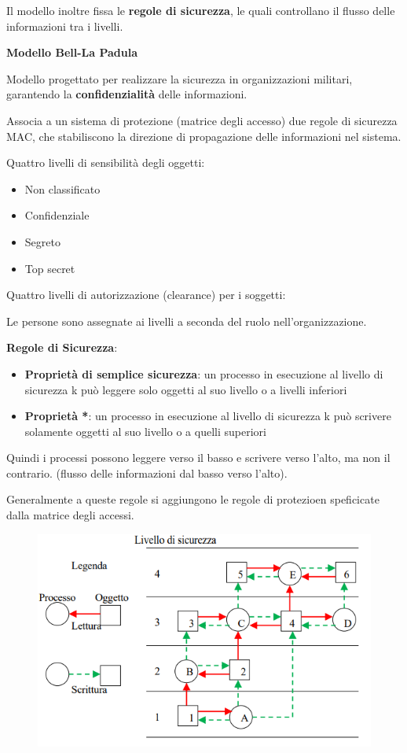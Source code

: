 \documentclass{article}
\begin{document}
\vspace{3mm}
Il modello inoltre fissa le \textbf{regole di sicurezza}, le quali controllano il flusso delle informazioni tra i livelli.

\vspace{3mm}
\textbf{Modello Bell-La Padula}
\vspace{3mm}

Modello progettato per realizzare la sicurezza in organizzazioni militari, garantendo la \textbf{confidenzialità} delle informazioni.

Associa a un sistema di protezione (matrice degli accesso) due regole di sicurezza MAC, che stabiliscono la direzione di propagazione delle informazioni nel sistema.

\vspace{3mm}
Quattro livelli di sensibilità degli oggetti:
\begin{itemize}
    \item Non classificato
    \item Confidenziale
    \item Segreto
    \item Top secret
\end{itemize}

\vspace{3mm}
Quattro livelli di autorizzazione (clearance) per i soggetti:

Le persone sono assegnate ai livelli a seconda del ruolo nell'organizzazione.

\vspace{3mm}
\textbf{Regole di Sicurezza}:
\begin{itemize}
    \item \textbf{Proprietà di semplice sicurezza}: un processo in esecuzione al livello di sicurezza k può leggere solo oggetti al suo livello o a livelli inferiori
    \item \textbf{Proprietà *}: un processo in esecuzione al livello di sicurezza k può scrivere solamente oggetti al suo livello o a quelli superiori
\end{itemize}

Quindi i processi possono leggere verso il basso e scrivere verso l'alto, ma non il contrario. (flusso delle informazioni dal basso verso l'alto).

\vspace{3mm}
Generalmente a queste regole si aggiungono le regole di protezioen speficicate dalla matrice degli accessi.

\begin{figure}[htbp]
    \centering
    \includegraphics[width=0.70\columnwidth]{imgs/bell-padula.PNG}
\end{figure}
\end{document}

